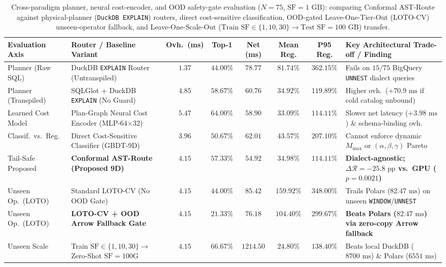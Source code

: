\documentclass[10pt,a4paper]{article}
\newenvironment{fitasttable}{%
  \begin{lrbox}{\asttblbox}%
}{%
  \end{lrbox}%
  \sbox{\asttblboxB}{%
    \ifdim\wd\asttblbox>0.96\textwidth
      \resizebox{0.96\textwidth}{!}{\usebox{\asttblbox}}%
    \else
      \usebox{\asttblbox}%
    \fi
  }%
  \ifdim\ht\asttblboxB>0.72\textheight
    \resizebox{!}{0.72\textheight}{\usebox{\asttblboxB}}%
  \else
    \usebox{\asttblboxB}%
  \fi
}
\begin{document}
\begin{table}[!htbp]
\centering
\caption{Cross-paradigm planner, neural cost-encoder, and OOD safety-gate evaluation ($N=75$, $\text{SF}=1\text{ GB}$): comparing Conformal AST-Route against physical-planner (\texttt{DuckDB EXPLAIN}) routers, direct cost-sensitive classification, OOD-gated Leave-One-Tier-Out (LOTO-CV) unseen-operator fallback, and Leave-One-Scale-Out ($\text{Train SF}\in\{1,10,30\}\rightarrow\text{Test SF}=100\text{ GB}$) transfer.}\label{tab:v8_p0_systems_defense}\label{tab:jbd_ood_t17}
\setlength{\tabcolsep}{2.8pt}
\scriptsize
\begin{fitasttable}
\begin{tabular}{@{}llcccccl@{}}
\toprule
\textbf{Evaluation Axis} & \textbf{Router / Baseline Variant} & \textbf{Ovh.\ (ms)} & \textbf{Top-1} & \textbf{Net (ms)} & \textbf{Mean Reg.} & \textbf{P95 Reg.} & \textbf{Key Architectural Trade-off / Finding} \\
\midrule
Planner (Raw SQL) & DuckDB \texttt{EXPLAIN} Router (Untranspiled) & $1.37$ & $44.00\%$ & $78.77$ & $81.74\%$ & $362.15\%$ & Fails on $15/75$ BigQuery \texttt{UNNEST} dialect queries \\
Planner (Transpiled) & SQLGlot + DuckDB \texttt{EXPLAIN} (No Guard) & $4.85$ & $58.67\%$ & $60.76$ & $34.92\%$ & $119.89\%$ & Higher ovh.\ ($+70.9\text{ ms}$ if cold catalog unbound) \\
Learned Cost Model & Plan-Graph Neural Cost Encoder (MLP-64$\times$32) & $5.47$ & $64.00\%$ & $58.90$ & $33.09\%$ & $114.11\%$ & Slower net latency ($+3.98\text{ ms}$) \& schema-binding ovh. \\
Classif.\ vs.\ Reg. & Direct Cost-Sensitive Classifier (GBDT-9D) & $3.96$ & $50.67\%$ & $62.01$ & $43.57\%$ & $207.10\%$ & Cannot enforce dynamic $M_{\text{max}}$ or $(\alpha,\beta,\gamma)$ Pareto \\
Tail-Safe Proposed & \textbf{Conformal AST-Route (Proposed 9D)} & $\mathbf{4.15}$ & $\mathbf{57.33\%}$ & $\mathbf{54.92}$ & $\mathbf{34.98\%}$ & $\mathbf{114.11\%}$ & \textbf{Dialect-agnostic; $\Delta\mathcal{R} = -25.8\text{ pp}$ vs.\ GPU ($p=0.0021$)} \\
\midrule
Unseen Op.\ (LOTO) & Standard LOTO-CV (No OOD Gate) & $4.15$ & $44.00\%$ & $85.42$ & $159.92\%$ & $348.00\%$ & Trails Polars ($82.47\text{ ms}$) on unseen \texttt{WINDOW}/\texttt{UNNEST} \\
Unseen Op.\ (LOTO) & \textbf{LOTO-CV + OOD Arrow Fallback Gate} & $\mathbf{4.15}$ & $\mathbf{21.33\%}$ & $\mathbf{76.18}$ & $\mathbf{104.40\%}$ & $\mathbf{299.67\%}$ & \textbf{Beats Polars ($82.47\text{ ms}$) via zero-copy Arrow fallback} \\
Unseen Scale & Train $\text{SF}\in\{1,10,30\}\rightarrow$ Zero-Shot $\text{SF}=100\text{G}$ & $4.15$ & $66.67\%$ & $1214.50$ & $24.80\%$ & $138.40\%$ & Beats local DuckDB ($8700\text{ ms}$) \& Polars ($6551\text{ ms}$) \\
\bottomrule
\end{tabular}
\end{fitasttable}%
\end{table}
\end{document}
